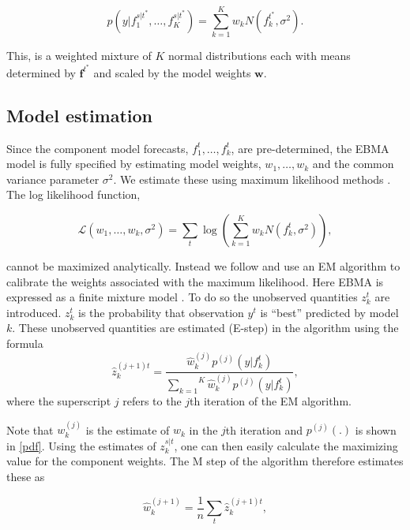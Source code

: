 \documentclass[12pt,fullpage,endnotes]{article}
\begin{document}
\begin{equation}
\label{pdf}p(y|f_1^{s|t^\ast},
\ldots, f_K^{s|t^\ast}) = \overset{K}{\underset{k=1}{\sum}} w_k
N(f_k^{t^\ast}, \sigma^2).
\end{equation}

\noindent This, is a weighted mixture of $K$ normal distributions each with 
means  determined by $\mathbf{f}^{t^\ast}$ and scaled by the
model weights $\mathbf{w}$.

\subsection{Model estimation}

Since the component model forecasts, $f^t_1, \ldots, f^t_k$, are
pre-determined, the EBMA model is fully specified by estimating model
weights, $w_1, \ldots, w_k$ and the common variance parameter
$\sigma^2$.  We estimate these using maximum likelihood methods
\citep{Raftery:2005}.  The log likelihood function,

\begin{equation}
\mathcal{L}(w_1, \ldots, w_k, \sigma^2)=\sum_t\log\left(\sum_{k=1}^Kw_kN(f^t_k, \sigma^2) \right),
\end{equation}


\noindent cannot be maximized analytically. Instead we follow \citet{Raftery:2005} and use an EM algorithm to calibrate the weights associated with the maximum likelihood. Here EBMA is expressed as a finite mixture model
\citep{mclachlan:peel:2000,imai:tingley:2012}.  To do so the
unobserved quantities $z_k^t$ are introduced. $z_k^t$ is the probability that
observation $y^t$ is ``best'' predicted by model $k$. These unobserved quantities are estimated (E-step) in the algorithm using the formula
\begin{equation}
\label{E-step}
\hat{z}^{(j+1)t}_{k} = \frac{\hat{w}^{(j)}_k
p^{(j)}(y|f_{k}^{t})}{\overset{K}{\underset{k=1}{\sum}}\hat{w}^{(j)}_kp^{(j)}(y|f_{k}^{t})},
\end{equation}
\noindent where the superscript $j$ refers to the $j$th iteration of
the EM algorithm.

Note that $w_k^{(j)}$ is the estimate of $w_k$ in the $j$th iteration and
$p^{(j)}(.)$ is shown in \eqref{pdf}. Using the estimates of
$z_{k}^{s|t}$, one can then easily calculate the maximizing value for the component weights. The M step of the algorithm therefore estimates these as 

\begin{equation}
\label{M-step}
\hat{w}^{(j+1)}_k=\frac{1}{n}\underset{t}{\sum}\hat{z}^{(j+1)t}_{k},
\end{equation}
\end{document}
